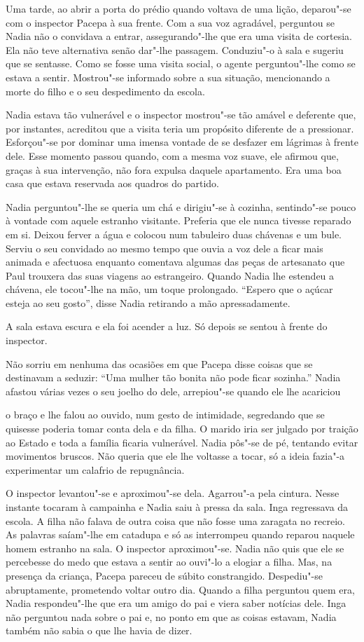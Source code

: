 Uma tarde, ao abrir a porta do prédio quando voltava de uma lição,
deparou"-se com o inspector Pacepa à sua frente. Com a sua voz agradável,
perguntou se Nadia não o convidava a entrar, assegurando"-lhe que era uma
visita de cortesia. Ela não teve alternativa senão dar"-lhe passagem.
Conduziu"-o à sala e sugeriu que se sentasse. Como se fosse uma visita
social, o agente perguntou"-lhe como se estava a sentir. Mostrou"-se
informado sobre a sua situação, mencionando a morte do filho e o seu
despedimento da escola.

Nadia estava tão vulnerável e o inspector mostrou"-se tão amável e
deferente que, por instantes, acreditou que a visita teria um propósito
diferente de a pressionar. Esforçou"-se por dominar uma imensa vontade de
se desfazer em lágrimas à frente dele. Esse momento passou quando, com
a mesma voz suave, ele afirmou que, graças à sua intervenção, não fora
expulsa daquele apartamento. Era uma boa casa que estava reservada aos
quadros do partido.

Nadia perguntou"-lhe se queria um chá e dirigiu"-se à cozinha, sentindo"-se
pouco à vontade com aquele estranho visitante. Preferia que ele nunca
tivesse reparado em si. Deixou ferver a água e colocou num tabuleiro
duas chávenas e um bule. Serviu o seu convidado ao mesmo tempo que
ouvia a voz dele a ficar mais animada e afectuosa enquanto comentava
algumas das peças de artesanato que Paul trouxera das suas viagens ao
estrangeiro. Quando Nadia lhe estendeu a chávena, ele tocou"-lhe na mão,
um toque prolongado. ``Espero que o açúcar esteja ao seu gosto'', disse
Nadia retirando a mão apressadamente.

A sala estava escura e ela foi acender a luz. Só depois se sentou à
frente do inspector.

Não sorriu em nenhuma das ocasiões em que Pacepa disse coisas que se
destinavam a seduzir: ``Uma mulher tão bonita não pode ficar sozinha.''
Nadia afastou várias vezes o seu joelho do dele, arrepiou"-se quando ele
lhe acariciou

o braço e lhe falou ao ouvido, num gesto de intimidade, segredando que
se quisesse poderia tomar conta dela e da filha. O marido iria ser
julgado por traição ao Estado e toda a família ficaria vulnerável. Nadia
pôs"-se de pé, tentando evitar movimentos bruscos. Não queria que ele
lhe voltasse a tocar, só a ideia fazia"-a experimentar um calafrio de
repugnância.

O inspector levantou"-se e aproximou"-se dela. Agarrou"-a pela cintura.
Nesse instante tocaram à campainha e Nadia saiu à pressa da sala. Inga
regressava da escola. A filha não falava de outra coisa que não fosse
uma zaragata no recreio. As palavras saíam"-lhe em catadupa e só as
interrompeu quando reparou naquele homem estranho na sala. O inspector
aproximou"-se. Nadia não quis que ele se percebesse do medo que estava a
sentir ao ouvi"-lo a elogiar a filha. Mas, na presença da criança, Pacepa
pareceu de súbito constrangido. Despediu"-se abruptamente, prometendo
voltar outro dia. Quando a filha perguntou quem era, Nadia respondeu"-lhe
que era um amigo do pai e viera saber notícias dele. Inga não perguntou
nada sobre o pai e, no ponto em que as coisas estavam, Nadia também não
sabia o que lhe havia de dizer.


